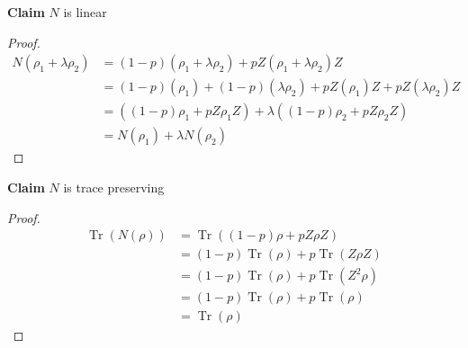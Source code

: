 \documentclass{article}
\DeclareMathOperator{\Tr}{Tr}
\begin{document}
\textbf{Claim} $N$ is linear
\begin{proof}
\begin{align*}
    N(\rho_1 + \lambda \rho_2) &= (1-p)(\rho_1 + \lambda \rho_2) + p Z (\rho_1 + \lambda \rho_2) Z \\
    &= (1-p)(\rho_1) + (1-p)(\lambda \rho_2) + p Z (\rho_1) Z + pZ(\lambda \rho_2) Z \\
    &= ((1-p)\rho_1 + p Z \rho_1 Z) + \lambda ((1-p)\rho_2 + p Z \rho_2 Z) \\
    &= N(\rho_1) + \lambda N(\rho_2)
\end{align*}
\end{proof}

\textbf{Claim} $N$ is trace preserving
\begin{proof}
\begin{align*}
    \Tr (N(\rho)) &= \Tr ((1-p)\rho + p Z \rho Z) \\
    &= (1-p) \Tr (\rho) + p \Tr (Z \rho Z) \\
    &= (1-p) \Tr (\rho) + p \Tr (Z^2 \rho) \\
    &= (1-p) \Tr (\rho) + p \Tr (\rho) \\
    &= \Tr (\rho)
\end{align*}
\end{proof}
\end{document}
